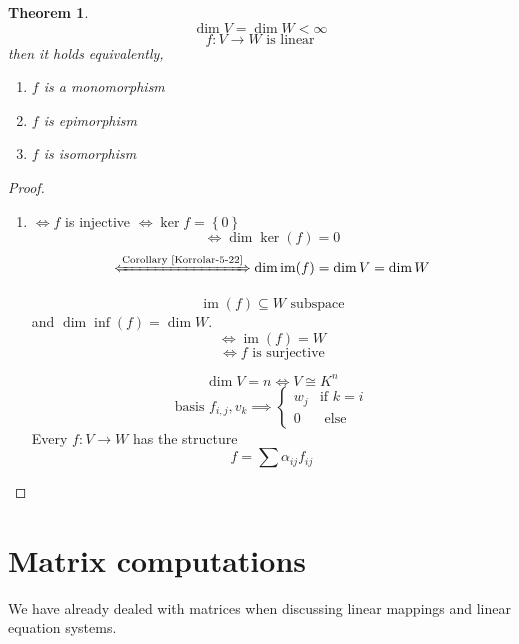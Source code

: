 \documentclass[a4paper,landscape,twocolumn]{article}
\newcommand\set[1]{\left\{#1\right\}}
\newtheorem{theorem}{Theorem}[section]
\DeclareMathOperator\image{im} %
\DeclareMathOperator\kernel{ker} %
\begin{document}
\begin{theorem}
  \label{satz-5-25}
  \[ \dim{V} = \dim{W} < \infty \]
  \[ f: V \rightarrow W \text{ is linear} \]
  then it holds equivalently,
  \begin{enumerate}
    \item $f$ is a monomorphism
    \item $f$ is epimorphism
    \item $f$ is isomorphism
  \end{enumerate}
\end{theorem}
\begin{proof}
  \begin{enumerate}
    \item $\iff f$ is injective $\iff \kernel{f} = \set{0}$
      \[ \iff \dim{\kernel(f)} = 0 \]
      \[ \xLeftrightarrow{\text{Corollary~\ref{Korrolar-5-22}}} \dim{\image(f)} = \dim{V} = \dim{W} \]

      \[ \image(f) \subseteq W \text{ subspace} \]
      and $\dim{\inf(f)} = \dim{W}$.
      \[ \iff \image(f) = W \]
      \[ \iff f \text{ is surjective} \]

      \[ \dim{V} = n \iff V \cong K^n \]
      \[
        \text{basis } f_{i,j}, v_k \implies
        \begin{cases}
          w_j & \text{if } k = i \\
          0 & \text{ else}
        \end{cases}
      \]
      Every $f: V \rightarrow W$ has the structure
      \[ f = \sum \alpha_{ij} f_{ij} \]
  \end{enumerate}
\end{proof}

\section{Matrix computations}
%
We have already dealed with matrices when discussing linear mappings and linear equation systems.
\end{document}
